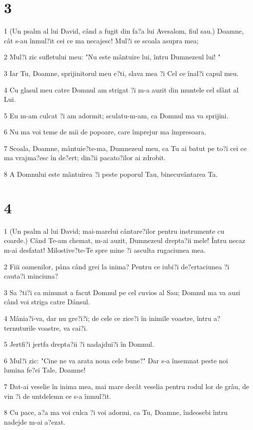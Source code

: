 \chapter{3}

\par 1 (Un psalm al lui David, când a fugit din fa?a lui Avesalom, fiul sau.) Doamne, cât s-au înmul?it cei ce ma necajesc! Mul?i se scoala asupra mea;
\par 2 Mul?i zic sufletului meu: "Nu este mântuire lui, întru Dumnezeul lui! "
\par 3 Iar Tu, Doamne, sprijinitorul meu e?ti, slava mea ?i Cel ce înal?i capul meu.
\par 4 Cu glasul meu catre Domnul am strigat ?i m-a auzit din muntele cel sfânt al Lui.
\par 5 Eu m-am culcat ?i am adormit; sculatu-m-am, ca Domnul ma va sprijini.
\par 6 Nu ma voi teme de mii de popoare, care împrejur ma împresoara.
\par 7 Scoala, Doamne, mântuie?te-ma, Dumnezeul meu, ca Tu ai batut pe to?i cei ce ma vrajma?esc în de?ert; din?ii pacato?ilor ai zdrobit.
\par 8 A Domnului este mântuirea ?i peste poporul Tau, binecuvântarea Ta.

\chapter{4}

\par 1 (Un psalm al lui David; mai-marelui cântare?ilor pentru instrumente cu coarde.) Când Te-am chemat, m-ai auzit, Dumnezeul drepta?ii mele! Întru necaz m-ai desfatat! Milostive?te-Te spre mine ?i asculta rugaciunea mea.
\par 2 Fiii oamenilor, pâna când grei la inima? Pentru ce iubi?i de?ertaciunea ?i cauta?i minciuna?
\par 3 Sa ?ti?i ca minunat a facut Domnul pe cel cuvios al Sau; Domnul ma va auzi când voi striga catre Dânsul.
\par 4 Mânia?i-va, dar nu gre?i?i; de cele ce zice?i în inimile voastre, întru a?ternuturile voastre, va cai?i.
\par 5 Jertfi?i jertfa drepta?ii ?i nadajdui?i în Domnul.
\par 6 Mul?i zic: "Cine ne va arata noua cele bune?" Dar s-a însemnat peste noi lumina fe?ei Tale, Doamne!
\par 7 Dat-ai veselie în inima mea, mai mare decât veselia pentru rodul lor de grâu, de vin ?i de untdelemn ce s-a înmul?it.
\par 8 Cu pace, a?a ma voi culca ?i voi adormi, ca Tu, Doamne, îndeosebi întru nadejde m-ai a?ezat.

